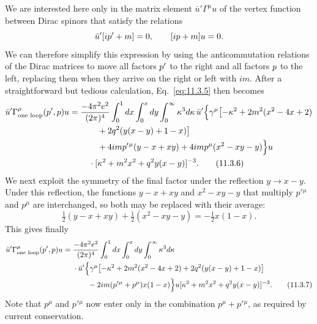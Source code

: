 We are interested here only in the matrix element
$\bar u'\Gamma^\mu u$ of the vertex function between Dirac spinors that
satisfy the relations
\[
\bar u'[i\sl{p}'+m]=0,\qquad [i\sl{p}+m]u=0.
\]
We can therefore simplify this expression by using the anticommutation
relations of the Dirac matrices to move all factors $\sl{p}'$ to the right and
all factors $\sl{p}$ to the left, replacing them when they arrive on the right
or left with $im$. After a straightforward but tedious calculation,
Eq.~\eqref{eq:11.3.5} then becomes
\begin{align}
\bar u'\Gamma^\mu_{\text{one loop}}(p',p)u={}&
 {-4\pi^2e^2\over(2\pi)^4}\int_0^1dx\int_0^xdy
 \int_0^\infty\kappa^3d\kappa\,
 \bar u'\Bigl\{\gamma^\mu\bigl[-\kappa^2+2m^2(x^2-4x+2)
\notag\\
&\qquad+2q^2(y(x-y)+1-x)\bigr]\notag\\
&\qquad+4im p'{}^\mu(y-x+xy)+4im p^\mu(x^2-xy-y)\Bigr\}u
\notag\\
&\quad\cdot[\kappa^2+m^2x^2+q^2y(x-y)]^{-3}.
\tag{11.3.6}\label{eq:11.3.6}
\end{align}
We next exploit the symmetry of the final factor under the reflection
$y\longrightarrow x-y$. Under this reflection, the functions $y-x+xy$ and
$x^2-xy-y$ that multiply $p'{}^\mu$ and $p^\mu$ are interchanged, so both
may be replaced with their average:
\[
\tfrac12(y-x+xy)+\tfrac12(x^2-xy-y)=-\tfrac12x(1-x).
\]
This gives finally
\begin{align}
\bar u'\Gamma^\mu_{\text{one loop}}(p',p)u={}&
 {-4\pi^2e^2\over(2\pi)^4}\int_0^1dx\int_0^xdy
 \int_0^\infty\kappa^3d\kappa\notag\\
&\cdot\bar u'\Bigl\{\gamma^\mu\bigl[-\kappa^2+2m^2(x^2-4x+2)
 +2q^2(y(x-y)+1-x)\bigr]\notag\\
&\qquad-2im(p'{}^\mu+p^\mu)x(1-x)\Bigr\}u
 [\kappa^2+m^2x^2+q^2y(x-y)]^{-3}.
\tag{11.3.7}\label{eq:11.3.7}
\end{align}
Note that $p^\mu$ and $p'{}^\mu$ now enter only in the combination
$p^\mu+p'{}^\mu$, as required by current conservation.

